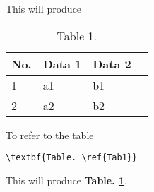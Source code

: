 \noindent This will produce
\begin{table}[t]
\begin{center}
    \begin{tabular}{ | l | l | l | l |}
    \hline
    \textbf{No.} & \textbf{Data 1} & \textbf{Data 2} \\ \hline
     1 & a1 & b1 \\ \hline
     2 & a2 & b2 \\ \hline
    \end{tabular}
\end{center}
\caption{Table 1.}
\label{Tab1}
\end{table}

\noindent To refer to the table
\begin{verbatim}
\textbf{Table. \ref{Tab1}}
\end{verbatim}

\noindent This will produce \textbf{Table. \ref{Tab1}}.



\cleardoublepage